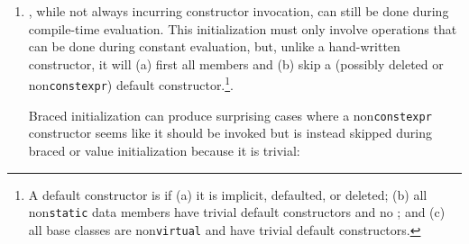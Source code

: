 \begin{enumerate}
{\begin{emcppslisting}
struct S1a { I3b i;            S1a()        { } };  // OK, (ù{}ù) is init.
struct S1b { I3b i;  constexpr S1b()        { } };  // OK, literal type.

struct S2a { I3b i;            S2a() = default; };  // OK, literal type.
struct S2b { I3b i;  constexpr S2b() = default; };  // OK, literal type.
\end{emcppslisting}
    

\noindent The example code above attempts to illustrate the subtle differences
between a data member of \emph{scalar}  (e.g.,
\lstinline!int!) and one of \emph{user-defined}  (e.g.,
\lstinline!I3b!). The first difference, illustrated by \lstinline!I1a! versus
\lstinline!S1a!, is that the former always leaves its own data member,
\lstinline!i!, uninitialized, while the latter invariably zero-initializes
its \lstinline!i!. The second difference, seen in \lstinline!I1b! versus
\lstinline!S1b!, is that the former is explicitly not initialized whereas
it is always implicitly initialized in the latter.

Note that, although every  needs to have a way to
construct it in a , not \emph{every}
constructor of a  needs to be ;
see .}


\item{, while not always incurring constructor invocation, can still be done during compile-time evaluation. This initialization must only involve operations that can be done during constant evaluation, but, unlike a hand-written constructor, it will (a) first  all members and (b) skip a (possibly deleted or non\lstinline!constexpr!)  default constructor.\cprotect\footnote{A default constructor is  if (a) it is implicit, defaulted, or deleted; (b) all non\lstinline!static! data members have trivial default constructors and no ; and (c) all base classes are non\lstinline!virtual! and have trivial default constructors.}.

Braced initialization can produce surprising cases where a
non\lstinline!constexpr! constructor seems like it should be invoked but is
instead skipped during braced or value initialization because it is
trivial:

}
\end{enumerate}
